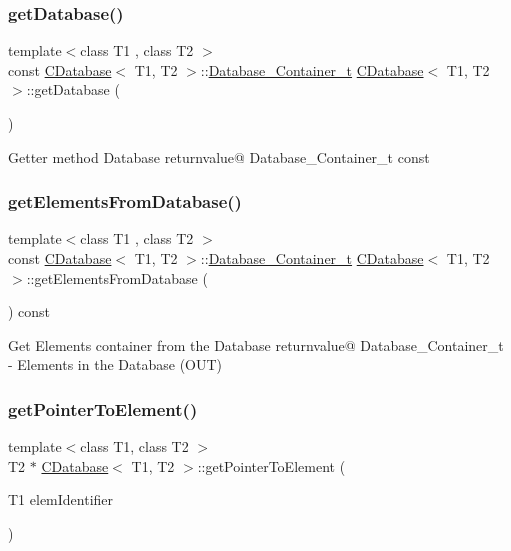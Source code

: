 \subsubsection{\texorpdfstring{get\+Database()}{getDatabase()}}
{\footnotesize\ttfamily template$<$class T1 , class T2 $>$ \\
const \hyperlink{classCDatabase}{C\+Database}$<$ T1, T2 $>$\+::\hyperlink{classCDatabase_ac20411b7c5997877aebb46d0bd3a8461}{Database\+\_\+\+Container\+\_\+t} \hyperlink{classCDatabase}{C\+Database}$<$ T1, T2 $>$\+::get\+Database (\begin{DoxyParamCaption}{ }\end{DoxyParamCaption})}

Getter method Database returnvalue@ Database\+\_\+\+Container\+\_\+t const \mbox{\label{classCDatabase_a2ecfd5ba202cea2332ddcd59237baf8e}} 
\subsubsection{\texorpdfstring{get\+Elements\+From\+Database()}{getElementsFromDatabase()}}
{\footnotesize\ttfamily template$<$class T1 , class T2 $>$ \\
const \hyperlink{classCDatabase}{C\+Database}$<$ T1, T2 $>$\+::\hyperlink{classCDatabase_ac20411b7c5997877aebb46d0bd3a8461}{Database\+\_\+\+Container\+\_\+t} \hyperlink{classCDatabase}{C\+Database}$<$ T1, T2 $>$\+::get\+Elements\+From\+Database (\begin{DoxyParamCaption}{ }\end{DoxyParamCaption}) const}

Get Elements\textquotesingle{} container from the Database returnvalue@ Database\+\_\+\+Container\+\_\+t -\/ Elements in the Database (O\+UT) \mbox{\label{classCDatabase_a708130facbed33fd15956bf3cf760372}} 
\subsubsection{\texorpdfstring{get\+Pointer\+To\+Element()}{getPointerToElement()}}
{\footnotesize\ttfamily template$<$class T1, class T2 $>$ \\
T2 $\ast$ \hyperlink{classCDatabase}{C\+Database}$<$ T1, T2 $>$\+::get\+Pointer\+To\+Element (\begin{DoxyParamCaption}\item[{T1}]{elem\+Identifier }\end{DoxyParamCaption})}

